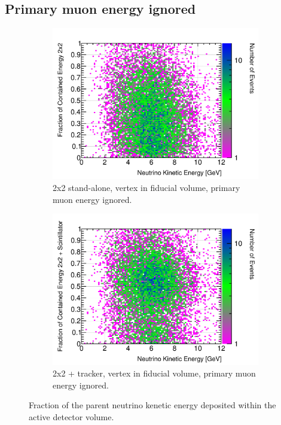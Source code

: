 \documentclass[10pt,a4paper,openany]{article}
\begin{document}
\clearpage
\subsection{Primary muon energy ignored}
\begin{figure}[!htb]
	\centering
	\begin{subfigure}[b]{0.49\textwidth}
		\centering
		\includegraphics[width=1.0\textwidth]{E_contained_frac_2x2_fiducial_gap_no_prim_muon.png}
		\caption{2x2 stand-alone, vertex in fiducial volume, primary muon energy ignored.}
		\label{}
	\end{subfigure}	
	\hfill
	\begin{subfigure}[b]{0.49\textwidth}
		\centering
		\includegraphics[width=1.0\textwidth]{E_contained_frac_2x2_Scintillator_fiducial_gap_no_prim_muon.png}
		\caption{2x2 + tracker, vertex in fiducial volume, primary muon energy ignored.}
		\label{}
	\end{subfigure}
  \caption{Fraction of the parent neutrino kenetic energy deposited within the active detector volume.}
\end{figure}
\end{document}
